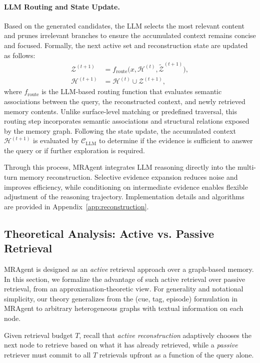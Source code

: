 \documentclass{llmxive}
\begin{document}
\paragraph{LLM Routing and State Update.}
Based on the generated candidates, the LLM selects the most relevant content and prunes irrelevant branches to ensure the accumulated context remains concise and focused.
Formally, the next active set and reconstruction state are updated as follows:
\begin{equation}
\begin{aligned}
\mathcal{Z}^{(t+1)}
&=
f_{\text{route}}\!\big(
x, \mathcal{H}^{(t)}, \widetilde{\mathcal{Z}}^{(t+1)}
\big), \\
\mathcal{H}^{(t+1)}
&=
\mathcal{H}^{(t)} \cup \mathcal{Z}^{(t+1)} ,
\end{aligned}
\end{equation}
where $f_{\text{route}}$ is the LLM-based routing function that evaluates semantic associations between the query, the reconstructed context, and newly retrieved memory contents.
Unlike surface-level matching or predefined traversal, this routing step  incorporates semantic associations and structural relations exposed by the memory graph. Following the state update, the accumulated context $\mathcal{H}^{(t+1)}$ is evaluated by $\mathcal{C}_{\text{LLM}}$ to determine if the evidence is sufficient to answer the query or if further exploration is required.

Through this process, MRAgent integrates LLM reasoning directly into the multi-turn memory reconstruction. 
Selective evidence expansion reduces noise and improves efficiency, while
conditioning on intermediate evidence enables flexible adjustment of the
reasoning trajectory.
Implementation details and algorithms are provided in Appendix~\ref{app:reconstruction}.

\subsection{Theoretical Analysis: Active vs. Passive Retrieval}
\label{subsec:theory}
MRAgent is designed as an \emph{active} retrieval approach over a graph-based memory. In this section, we formalize the advantage of such active retrieval over passive retrieval, from an approximation-theoretic view. 
For generality and notational simplicity, our theory generalizes from the (cue, tag, episode) formulation in MRAgent to arbitrary heterogeneous graphs with textual information on each node.

Given retrieval budget \(T\), recall that \emph{active reconstruction} adaptively chooses the next node to retrieve based on what it has already retrieved, while a
\emph{passive} retriever must commit to all \(T\) retrievals upfront as a function of the query alone.
\end{document}
